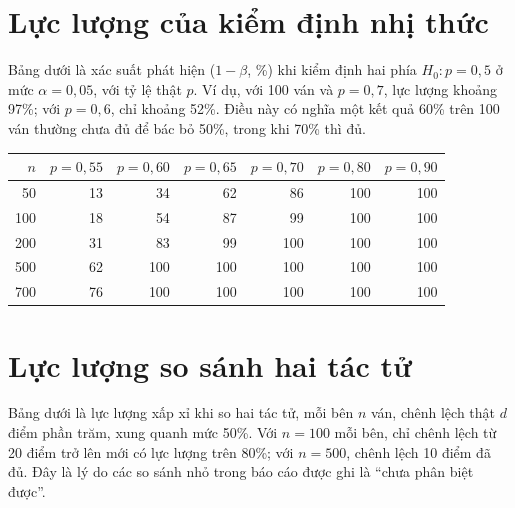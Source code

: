 \section{Lực lượng của kiểm định nhị thức}

Bảng dưới là xác suất phát hiện ($1-\beta$, \%) khi kiểm định hai phía $H_0:p=0{,}5$ ở mức $\alpha=0{,}05$, với tỷ lệ thật $p$. Ví dụ, với 100 ván và $p=0{,}7$, lực lượng khoảng 97\%; với $p=0{,}6$, chỉ khoảng 52\%. Điều này có nghĩa một kết quả 60\% trên 100 ván thường chưa đủ để bác bỏ 50\%, trong khi 70\% thì đủ.

\begin{center}\small

\begin{tabular}{@{}rrrrrrr@{}}

\toprule

$n$ & $p=0,55$ & $p=0,60$ & $p=0,65$ & $p=0,70$ & $p=0,80$ & $p=0,90$ \\

\midrule

50 & 13 & 34 & 62 & 86 & 100 & 100 \\

100 & 18 & 54 & 87 & 99 & 100 & 100 \\

200 & 31 & 83 & 99 & 100 & 100 & 100 \\

500 & 62 & 100 & 100 & 100 & 100 & 100 \\

700 & 76 & 100 & 100 & 100 & 100 & 100 \\

\bottomrule

\end{tabular}

\end{center}

\section{Lực lượng so sánh hai tác tử}

Bảng dưới là lực lượng xấp xỉ khi so hai tác tử, mỗi bên $n$ ván, chênh lệch thật $d$ điểm phần trăm, xung quanh mức 50\%. Với $n=100$ mỗi bên, chỉ chênh lệch từ 20 điểm trở lên mới có lực lượng trên 80\%; với $n=500$, chênh lệch 10 điểm đã đủ. Đây là lý do các so sánh nhỏ trong báo cáo được ghi là ``chưa phân biệt được''.

